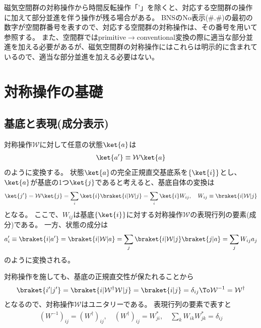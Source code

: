 \documentclass[11pt]{easymemo}
\begin{document}
磁気空間群の対称操作から時間反転操作「'」を除くと、対応する空間群の操作に加えて部分並進を伴う操作が残る場合がある。
BNSのNo表示(\#.\#)の最初の数字が空間群番号を表すので、対応する空間群の対称操作は、その番号を用いて参照する。
また、空間群ではprimitive$\to$conventional変換の際に適当な部分並進を加える必要があるが、磁気空間群の対称操作にはこれらは明示的に含まれているので、適当な部分並進を加える必要はない。


\newpage
\appendix


\section{対称操作の基礎}

\subsection{基底と表現(成分表示)}

対称操作$\mathcal{W}$に対して任意の状態$\ket{a}$は
\begin{align}
  \ket{a'}\equiv\mathcal{W}\ket{a}
\end{align}
のように変換する。
状態$\ket{a}$の完全正規直交基底系を$\{\ket{i}\}$とし、$\ket{a}$が基底の1つ$\ket{j}$であると考えると、基底自体の変換は
\begin{align}
  \ket{j'}=\mathcal{W}\ket{j}
  =\sum_{i}\ket{i}\braket{i|\mathcal{W}|j}
  =\sum_{i}\ket{i}W_{ij},
  \quad
  W_{ij}\equiv\braket{i|\mathcal{W}|j}
  \label{eq:59}
\end{align}
となる。
ここで、$W_{ij}$は基底$\{\ket{i}\}$に対する対称操作$\mathcal{W}$の表現行列の要素(成分)である。
一方、状態の成分は
\begin{align}
  a_{i}'\equiv\braket{i|a'}=\braket{i|\mathcal{W}|a}
  =\sum_{j}\braket{i|\mathcal{W}|j}\braket{j|a}
  =\sum_{j}W_{ij}a_{j}
\end{align}
のように変換される。

対称操作を施しても、基底の正規直交性が保たれることから
\begin{align}
  \braket{i'|j'}=\braket{i|\mathcal{W}^{\dagger}\mathcal{W}^{}|j}=\braket{i|j}=\delta_{ij}
  \To
  \mathcal{W}^{-1}=\mathcal{W}^{\dagger}
\end{align}
となるので、対称操作$\mathcal{W}$はユニタリーである。
表現行列の要素で表すと
\begin{align}
  (W^{-1})_{ij}=(W^{\dagger})_{ij},
  \quad
  (W^{\dagger})_{ij}=W_{ji}^{*},
  \quad
  \sum_{k}W_{ik}^{}W_{jk}^{*}=\delta_{ij}
\end{align}
\end{document}
